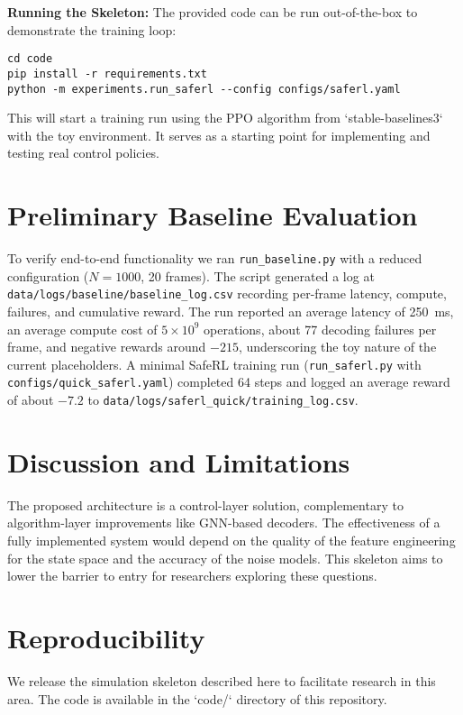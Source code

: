 \documentclass[conference]{IEEEtran}
\begin{document}
\textbf{Running the Skeleton:} The provided code can be run out-of-the-box to demonstrate the training loop:
\begin{verbatim}
cd code
pip install -r requirements.txt
python -m experiments.run_saferl --config configs/saferl.yaml
\end{verbatim}
This will start a training run using the PPO algorithm from `stable-baselines3` with the toy environment. It serves as a starting point for implementing and testing real control policies.

\section{Preliminary Baseline Evaluation}
To verify end-to-end functionality we ran \texttt{run\_baseline.py} with a reduced configuration ($N=1000$, 20 frames). The script generated a log at \texttt{data/logs/baseline/baseline\_log.csv} recording per-frame latency, compute, failures, and cumulative reward. The run reported an average latency of \SI{250}{ms}, an average compute cost of $5\times10^9$ operations, about 77 decoding failures per frame, and negative rewards around $-215$, underscoring the toy nature of the current placeholders. A minimal SafeRL training run (\texttt{run\_saferl.py} with \texttt{configs/quick\_saferl.yaml}) completed 64 steps and logged an average reward of about $-7.2$ to \texttt{data/logs/saferl\_quick/training\_log.csv}.

\section{Discussion and Limitations}
The proposed architecture is a control-layer solution, complementary to algorithm-layer improvements like GNN-based decoders. The effectiveness of a fully implemented system would depend on the quality of the feature engineering for the state space and the accuracy of the noise models. This skeleton aims to lower the barrier to entry for researchers exploring these questions.

\section{Reproducibility}
We release the simulation skeleton described here to facilitate research in this area. The code is available in the `code/` directory of this repository.



\end{document}
